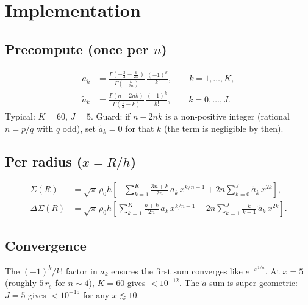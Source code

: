 \documentclass{article}
\begin{document}
\section{Implementation}
\label{sec:impl}

\subsection{\texorpdfstring{Precompute (once per $n$)}{Precompute (once per n)}}

\begin{align}
a_k &= \frac{\Gamma(-\tfrac32-\tfrac{k}{2n})}{\Gamma(-\tfrac{k}{2n})}\,
       \frac{(-1)^k}{k!}, \qquad k=1,\ldots,K,\\
\tilde a_k &= \frac{\Gamma(n-2nk)}{\Gamma(\tfrac12-k)}\,\frac{(-1)^k}{k!},
       \qquad k=0,\ldots,J.
\end{align}
Typical: $K=60$, $J=5$.
Guard: if $n-2nk$ is a non-positive integer (rational $n=p/q$ with $q$ odd),
set $\tilde a_k=0$ for that $k$ (the term is negligible by then).

\subsection{\texorpdfstring{Per radius ($x=R/h$)}{Per radius (x=R/h)}}
\begin{align}
\Sigma(R) &= \sqrt\pi\,\rho_0 h
  \left[-\sum_{k=1}^K \frac{3n+k}{2n}\,a_k\,x^{k/n+1}
  + 2n\sum_{k=0}^J \tilde a_k\,x^{2k}\right],
\label{eq:impl-Sigma}\\[4pt]
\Delta\Sigma(R) &= \sqrt\pi\,\rho_0 h
  \left[\sum_{k=1}^K \frac{n+k}{2n}\,a_k\,x^{k/n+1}
  - 2n\sum_{k=1}^J \frac{k}{k+1}\,\tilde a_k\,x^{2k}\right].
\label{eq:impl-DS}
\end{align}

\subsection{Convergence}
The $(-1)^k/k!$ factor in $a_k$ ensures the first sum converges like
$e^{-x^{1/n}}$. At $x=5$ (roughly $5\,r_s$ for $n\sim4$), $K=60$ gives
$<10^{-12}$. The $\tilde a$ sum is super-geometric: $J=5$ gives $<10^{-15}$
for any $x\lesssim10$.
\end{document}
